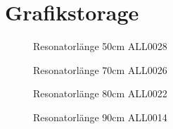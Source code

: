 \documentclass[11pt, a4paper]{article}
\numberwithin{equation}{section}
\begin{document}
\section{Grafikstorage}
\FloatBarrier
\begin{figure}
\centering

\caption{Resonatorlänge 50cm ALL0028}
\label{fig:ALL0028}
\end{figure}
\begin{figure}
\centering

\caption{Resonatorlänge 70cm ALL0026}
\end{figure}
\begin{figure}
\centering

\caption{Resonatorlänge 80cm ALL0022}
\end{figure}
\begin{figure}
\centering

\caption{Resonatorlänge 90cm ALL0014}
\end{figure}
\clearpage
\vspace{\fill}
\end{document}
